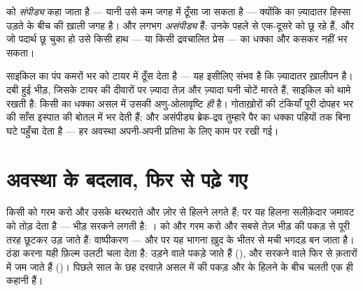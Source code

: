 \begin{proposition}[गैसें दबती हैं; द्रव और ठोस नहीं]\label{prop:g7:states-of-matter:squeeze}
 को \emph{संपीड्य} कहा जाता है --- यानी उसे कम जगह
में ठूँसा जा सकता है --- क्योंकि  का ज़्यादातर हिस्सा उड़ते  के
बीच की ख़ाली जगह है।  और  लगभग \emph{असंपीड्य} हैं: उनके 
पहले से एक-दूसरे को छू रहे हैं, और जो पदार्थ छू चुका हो उसे किसी हाथ
--- या किसी द्रवचालित प्रेस --- का धक्का और कसकर नहीं भर सकता।
\end{proposition}

\begin{example}[दबी हुई हवा काम पर]\label{ex:g7:states-of-matter:squeezed}
साइकिल का पंप कमरों भर  को टायर में ठूँस देता है --- यह इसीलिए
संभव है कि  ज़्यादातर ख़ालीपन है। दबी हुई भीड़, जिसके  टायर की
दीवारों पर ज़्यादा तेज़ और ज़्यादा घनी चोटें मारते हैं, साइकिल को थामे
रखती है: किसी  का धक्का असल में उसकी अणु-ओलावृष्टि \emph{ही} है।
गोताख़ोरों की टंकियाँ पूरी दोपहर भर की साँस इस्पात की बोतल में भर देती
हैं; और असंपीड्य ब्रेक-द्रव तुम्हारे पैर का धक्का पहियों तक बिना घटे
पहुँचा देता है --- हर अवस्था अपनी-अपनी प्रतिभा के लिए काम पर रखी गई।
\end{example}

\section{अवस्था के बदलाव, फिर से पढ़े गए}

\begin{example}[दरवाज़े, अणु-दर-अणु]\label{ex:g7:states-of-matter:doors}
किसी  को गरम करो और उसके थरथराते  और ज़ोर से हिलने लगते हैं;
 पर यह हिलना सलीक़ेदार जमावट को तोड़ देता है --- भीड़ सरकने
लगती है: ।  को और गरम करो और सबसे तेज़  भीड़ की पकड़ से
पूरी तरह छूटकर उड़ जाते हैं: वाष्पीकरण --- और  पर यह भागना
ख़ुद  के भीतर से मची भगदड़ बन जाता है। ठंडा करना यही फ़िल्म उलटी
चला देता है: उड़ने वाले पकड़े जाते हैं (), और सरकने वाले फिर से
क़तारों में जम जाते हैं ()। पिछले साल के छह दरवाज़े असल में
 की पकड़ और  के हिलने के बीच चलती एक ही कहानी हैं।
\end{example}


